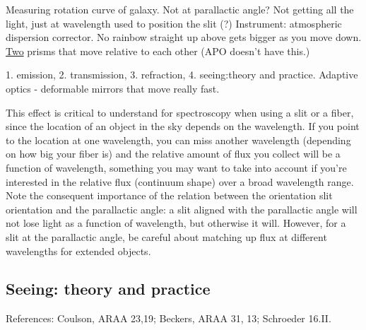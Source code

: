 \documentclass[12pt]{article}
\begin{document}
\textcolor{myBlue}{Measuring rotation curve of galaxy. Not at parallactic
angle? Not getting all the light, just at wavelength used to
position the slit (?)
Instrument: atmospheric dispersion corrector.
No rainbow straight up above gets bigger as you move down.
\underline{Two} prisms that move relative to each other
(APO doesn't have this.)}

\textcolor{myBlue}{1. emission, 2. transmission, 3. refraction,
4. seeing:theory and practice. Adaptive optics - deformable mirrors
that move really fast}.

This effect is critical to understand for spectroscopy when using a
slit or a fiber, since the location of an object in the sky depends on
the wavelength. If you point to the location at one wavelength, you
can miss another wavelength
\textcolor{myBlue}{(depending on how big your fiber is)}
and the relative amount of flux you
collect will be a function of wavelength, something you may want to
take into account if you're interested in the relative flux (continuum
shape) over a broad wavelength range. Note the consequent importance
of the relation between the orientation slit orientation and the
parallactic angle: a slit aligned with the parallactic angle will not
lose light as a function of wavelength, but otherwise it will.
However, for a slit at the parallactic angle, be careful about
matching up flux at different wavelengths for extended objects.
\subsection{Seeing: theory and practice}
References: Coulson, ARAA 23,19; Beckers, ARAA 31, 13; Schroeder
16.II.
\end{document}
